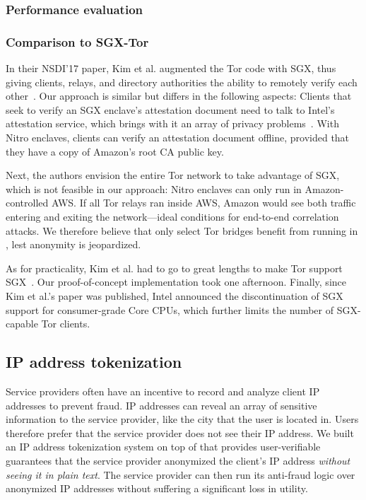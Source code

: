 \subsubsection{Performance evaluation}


\subsubsection{Comparison to SGX-Tor}

In their NSDI'17 paper, Kim et al. augmented the Tor code with SGX, thus giving
clients, relays, and directory authorities the ability to remotely verify each
other~\cite{Kim2017a}.  Our approach is similar but differs in the following
aspects:
%
Clients that seek to verify an SGX enclave's attestation document need to talk
to Intel's attestation service, which brings with it an array of privacy
problems~\cite[\S~1.2]{Chen2019a}.  With Nitro enclaves, clients can verify an
attestation document offline, provided that they have a copy of Amazon's root CA
public key.

Next, the authors envision the entire Tor network to take advantage of SGX,
which is not feasible in our approach: Nitro enclaves can only run in
Amazon-controlled AWS.  If all Tor relays ran inside AWS, Amazon would see both
traffic entering and exiting the network---ideal conditions for end-to-end
correlation attacks.  We therefore believe that only select Tor bridges benefit
from running in \tool{}, lest anonymity is jeopardized.

As for practicality, Kim et al. had to go to great lengths to make Tor support
SGX~\cite[\S~5]{Kim2017a}.  Our proof-of-concept implementation took one
afternoon.  Finally, since Kim et al.'s paper was published, Intel announced the
discontinuation of SGX support for consumer-grade Core CPUs, which further
limits the number of SGX-capable Tor clients.


\subsection{IP address tokenization}
\label{sec:tokenization}

Service providers often have an incentive to record and analyze client IP
addresses to prevent fraud.  IP addresses can reveal an array of sensitive
information to the service provider, like the city that the user is located in.
Users therefore prefer that the service provider does not see their IP address.
We built an IP address tokenization system on top of \tool{} that provides
user-verifiable guarantees that the service provider anonymized the client's IP
address \emph{without seeing it in plain text}.  The service provider can then
run its anti-fraud logic over anonymized IP addresses without suffering a
significant loss in utility.

